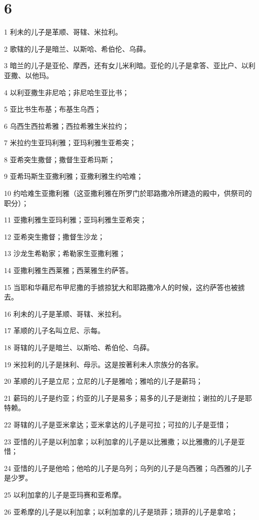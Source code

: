 \chapter{6}

\par 1 利未的儿子是革顺、哥辖、米拉利。
\par 2 歌辖的儿子是暗兰、以斯哈、希伯伦、乌薛。
\par 3 暗兰的儿子是亚伦、摩西，还有女儿米利暗。亚伦的儿子是拿答、亚比户、以利亚撒、以他玛。
\par 4 以利亚撒生非尼哈；非尼哈生亚比书；
\par 5 亚比书生布基；布基生乌西；
\par 6 乌西生西拉希雅；西拉希雅生米拉约；
\par 7 米拉约生亚玛利雅；亚玛利雅生亚希突；
\par 8 亚希突生撒督；撒督生亚希玛斯；
\par 9 亚希玛斯生亚撒利雅；亚撒利雅生约哈难；
\par 10 约哈难生亚撒利雅（这亚撒利雅在所罗门於耶路撒冷所建造的殿中，供祭司的职分）；
\par 11 亚撒利雅生亚玛利雅；亚玛利雅生亚希突；
\par 12 亚希突生撒督；撒督生沙龙；
\par 13 沙龙生希勒家；希勒家生亚撒利雅；
\par 14 亚撒利雅生西莱雅；西莱雅生约萨答。
\par 15 当耶和华藉尼布甲尼撒的手掳掠犹大和耶路撒冷人的时候，这约萨答也被掳去。
\par 16 利未的儿子是革顺、哥辖、米拉利。
\par 17 革顺的儿子名叫立尼、示每。
\par 18 哥辖的儿子是暗兰、以斯哈、希伯伦、乌薛。
\par 19 米拉利的儿子是抹利、母示。这是按著利未人宗族分的各家。
\par 20 革顺的儿子是立尼；立尼的儿子是雅哈；雅哈的儿子是薪玛；
\par 21 薪玛的儿子是约亚；约亚的儿子是易多；易多的儿子是谢拉；谢拉的儿子是耶特赖。
\par 22 哥辖的儿子是亚米拿达；亚米拿达的儿子是可拉；可拉的儿子是亚惜；
\par 23 亚惜的儿子是以利加拿；以利加拿的儿子是以比雅撒；以比雅撒的儿子是亚惜；
\par 24 亚惜的儿子是他哈；他哈的儿子是乌列；乌列的儿子是乌西雅；乌西雅的儿子是少罗。
\par 25 以利加拿的儿子是亚玛赛和亚希摩。
\par 26 亚希摩的儿子是以利加拿；以利加拿的儿子是琐菲；琐菲的儿子是拿哈；
